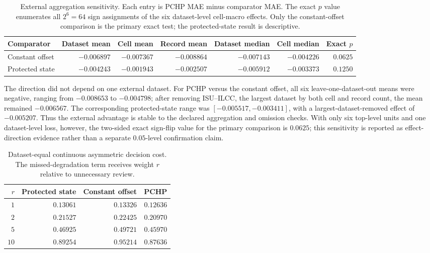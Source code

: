 \documentclass[11pt]{article}
\begin{document}
\begin{table}[H]
\centering
\caption{External aggregation sensitivity. Each entry is PCHP MAE minus comparator MAE. The exact $p$ value enumerates all $2^6=64$ sign assignments of the six dataset-level cell-macro effects. Only the constant-offset comparison is the primary exact test; the protected-state result is descriptive.}
\label{tab:external_robustness}
\scriptsize
\begin{tabular}{lrrrrrr}
\toprule
Comparator & Dataset mean & Cell mean & Record mean & Dataset median & Cell median & Exact $p$ \\
\midrule
Constant offset & $-0.006897$ & $-0.007367$ & $-0.008864$ & $-0.007143$ & $-0.004226$ & $0.0625$ \\
Protected state & $-0.004243$ & $-0.001943$ & $-0.002507$ & $-0.005912$ & $-0.003373$ & $0.1250$ \\
\bottomrule
\end{tabular}
\end{table}

The direction did not depend on one external dataset.  For PCHP versus the constant offset, all six leave-one-dataset-out means were negative, ranging from $-0.008653$ to $-0.004798$; after removing ISU--ILCC, the largest dataset by both cell and record count, the mean remained $-0.006567$.  The corresponding protected-state range was $[-0.005517,-0.003411]$, with a largest-dataset-removed effect of $-0.005207$.  Thus the external advantage is stable to the declared aggregation and omission checks.  With only six top-level units and one dataset-level loss, however, the two-sided exact sign-flip value for the primary comparison is $0.0625$; this sensitivity is reported as effect-direction evidence rather than a separate $0.05$-level confirmation claim.

\begin{table}[H]
\centering
\caption{Dataset-equal continuous asymmetric decision cost. The missed-degradation term receives weight $r$ relative to unnecessary review.}
\label{tab:external_decision_cost}
\begin{tabular}{rrrr}
\toprule
$r$ & Protected state & Constant offset & PCHP \\
\midrule
$1$  & $0.13061$ & $0.13326$ & $0.12636$ \\
$2$  & $0.21527$ & $0.22425$ & $0.20970$ \\
$5$  & $0.46925$ & $0.49721$ & $0.45970$ \\
$10$ & $0.89254$ & $0.95214$ & $0.87636$ \\
\bottomrule
\end{tabular}
\end{table}
\end{document}
